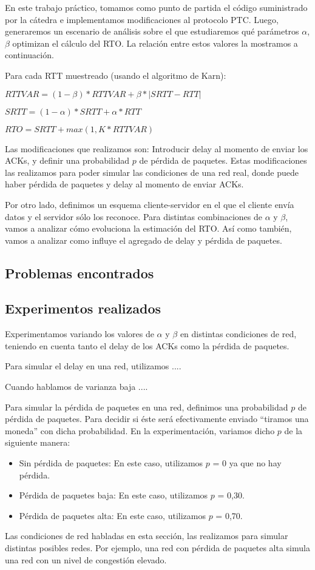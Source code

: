 En este trabajo práctico, tomamos como punto de partida el código suministrado por la cátedra e implementamos modificaciones al protocolo PTC. Luego, generaremos un escenario de análisis sobre el que estudiaremos qué parámetros $\alpha$, $\beta$ optimizan el cálculo del RTO. La relación entre estos valores la mostramos a continuación.

Para cada RTT muestreado (usando el algoritmo de Karn):

\indent \indent $RTTVAR = (1-\beta) * RTTVAR + \beta * |SRTT-RTT|$

\indent \indent $SRTT = (1-\alpha) * SRTT + \alpha * RTT$

\indent \indent $RTO = SRTT + max (1,K * RTTVAR)$

Las modificaciones que realizamos son: Introducir delay al momento de enviar los ACKs, y definir una probabilidad $p$ de pérdida de paquetes. Estas modificaciones las realizamos para poder simular las condiciones de una red real, donde puede haber pérdida de paquetes y delay al momento de enviar ACKs.

Por otro lado, definimos un esquema cliente-servidor en el que el cliente envía datos y el servidor sólo los reconoce. Para distintas combinaciones de $\alpha$ y $\beta$, vamos a analizar cómo evoluciona la estimación del RTO. Así como también, vamos a analizar como influye el agregado de delay y pérdida de paquetes.

\subsection{Problemas encontrados}

\subsection{Experimentos realizados}
Experimentamos variando los valores de $\alpha$ y $\beta$ en distintas condiciones de red, teniendo en cuenta tanto el delay de los ACKs como la pérdida de paquetes.


Para simular el delay en una red, utilizamos ....
 
Cuando hablamos de varianza baja ....
 
Para simular la pérdida de paquetes en una red, definimos una probabilidad $p$ de pérdida de paquetes. Para decidir si éste será efectivamente enviado “tiramos una moneda” con dicha probabilidad. En la experimentación, variamos dicho $p$ de la siguiente manera:

\begin{itemize}
 \item Sin pérdida de paquetes: En este caso, utilizamos $p$ = 0 ya que no hay pérdida. 
 \item Pérdida de paquetes baja: En este caso, utilizamos $p$ = 0,30.
 \item Pérdida de paquetes alta: En este caso, utilizamos $p$ = 0,70.
\end{itemize}

Las condiciones de red habladas en esta sección, las realizamos para simular distintas posibles redes. Por ejemplo, una red con pérdida de paquetes alta simula una red con un nivel de congestión elevado.